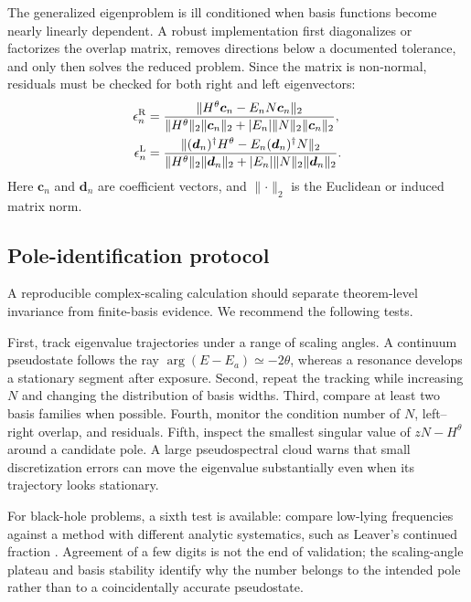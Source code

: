 The generalized eigenproblem is ill conditioned when basis functions become
nearly linearly dependent.  A robust implementation first diagonalizes or
factorizes the overlap matrix, removes directions below a documented
tolerance, and only then solves the reduced problem.  Since the matrix is
non-normal, residuals must be checked for both right and left eigenvectors:
\begin{align}
  \epsilon_n^{\mathrm R}
  &=\frac{\lVert H^\theta\bm c_n
  -E_nN\bm c_n\rVert_2}
  {\lVert H^\theta\rVert_2\lVert\bm c_n\rVert_2
  +|E_n|\lVert N\rVert_2\lVert\bm c_n\rVert_2},
  \notag\\
  \epsilon_n^{\mathrm L}
  &=\frac{\lVert (\bm d_n)^{\dagger}H^\theta
  -E_n(\bm d_n)^{\dagger}N\rVert_2}
  {\lVert H^\theta\rVert_2\lVert\bm d_n\rVert_2
  +|E_n|\lVert N\rVert_2\lVert\bm d_n\rVert_2} .
  \label{eq:left-right-residuals}
\end{align}
Here $\bm c_n$ and $\bm d_n$ are coefficient vectors, and
$\lVert\cdot\rVert_2$ is the Euclidean or induced matrix norm.

\subsection{Pole-identification protocol}
\label{subsec:pole-protocol}

A reproducible complex-scaling calculation should separate theorem-level
invariance from finite-basis evidence.  We recommend the following tests.

First, track eigenvalue trajectories under a range of scaling angles.  A
continuum pseudostate follows the ray $\arg(E-E_a)\simeq-2\theta$, whereas a
resonance develops a stationary segment after exposure.  Second, repeat the
tracking while increasing $N$ and changing the distribution of basis widths.
Third, compare at least two basis families when possible.  Fourth, monitor the
condition number of $N$, left--right overlap, and residuals.  Fifth, inspect
the smallest singular value of $zN-H^\theta$ around a candidate pole.  A large
pseudospectral cloud warns that small discretization errors can move the
eigenvalue substantially even when its trajectory looks stationary.

For black-hole problems, a sixth test is available: compare low-lying
frequencies against a method with different analytic systematics, such as
Leaver's continued fraction
\cite{Leaver:1985ax,Ogawa:2026veu}.  Agreement of a few digits is not the end
of validation; the scaling-angle plateau and basis stability identify why the
number belongs to the intended pole rather than to a coincidentally accurate
pseudostate.


